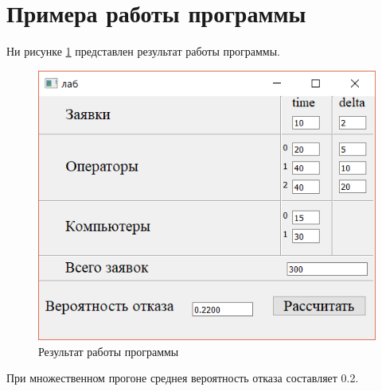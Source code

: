 \section{Примера работы программы}

Ни рисунке \ref{fig:result} представлен результат работы программы.

\begin{figure}[h]
	\centering
	\includegraphics[width=0.7\linewidth]{result}
	\caption{Результат работы программы}
	\label{fig:result}
\end{figure}

При множественном прогоне среднея вероятность отказа составляет 0.2.